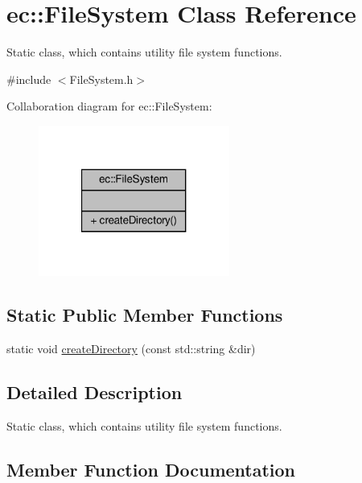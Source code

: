 \hypertarget{classec_1_1_file_system}{}\section{ec\+:\+:File\+System Class Reference}
\label{classec_1_1_file_system}


Static class, which contains utility file system functions.  




{\ttfamily \#include $<$File\+System.\+h$>$}



Collaboration diagram for ec\+:\+:File\+System\+:\nopagebreak
\begin{figure}[H]
\begin{center}
\leavevmode
\includegraphics[width=178pt]{classec_1_1_file_system__coll__graph}
\end{center}
\end{figure}
\subsection*{Static Public Member Functions}
\begin{DoxyCompactItemize}
\item 
static void \mbox{\hyperlink{classec_1_1_file_system_a34d1b34d62da05910b864ab59c6a3e68}{create\+Directory}} (const std\+::string \&dir)
\end{DoxyCompactItemize}


\subsection{Detailed Description}
Static class, which contains utility file system functions. 

\subsection{Member Function Documentation}
\mbox{\label{classec_1_1_file_system_a34d1b34d62da05910b864ab59c6a3e68}} 
